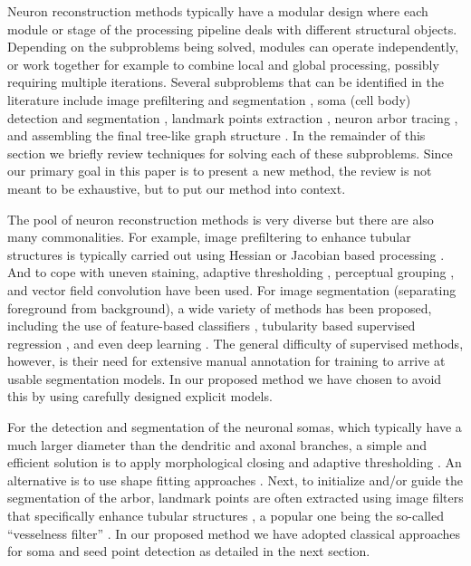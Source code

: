 Neuron reconstruction methods typically have a modular design where each module or stage of the processing pipeline deals with different structural objects. Depending on the subproblems being solved, modules can operate independently, or work together for example to combine local and global processing, possibly requiring multiple iterations. Several subproblems that can be identified in the literature include image prefiltering and segmentation \cite{zhou2015adaptive, turetken2011automated, sironi2016multiscale, mukherjee2013vector}, soma (cell body) detection and segmentation \cite{quan2013neurogps}, landmark points extraction \cite{al2008improved, wang2011broadly, choromanska2012automatic, su2012junction, radojevic2016fuzzy}, neuron arbor tracing \cite{zhao2011automated, liu2016rivulet, leandro2009automatic, radojevic2017automated, xiao2013app2}, and assembling the final tree-like graph structure \cite{zhou2016tremap, turetken2011automated, yuan2009mdl}. In the remainder of this section we briefly review techniques for solving each of these subproblems. Since our primary goal in this paper is to present a new method, the review is not meant to be exhaustive, but to put our method into context.

The pool of neuron reconstruction methods is very diverse \cite{meijering2010neuron, donohue2011automated, acciai2016automated, peng2015bigneuron} but there are also many commonalities. For example, image prefiltering to enhance tubular structures is typically carried out using Hessian or Jacobian based processing \cite{xiong2006automated, al2008improved, yuan2009mdl, wang2011broadly}. And to cope with uneven staining, adaptive thresholding \cite{zhou2015adaptive}, perceptual grouping \cite{narayanaswamy20113}, and vector field convolution \cite{mukherjee2015tubularity} have been used. For image segmentation (separating foreground from background), a wide variety of methods has been proposed, including the use of feature-based classifiers \cite{turetken2011automated, chen2015smarttracing, jimenez2015improved}, tubularity based supervised regression \cite{sironi2016multiscale}, and even deep learning \cite{li2017deep}. The general difficulty of supervised methods, however, is their need for extensive manual annotation for training to arrive at usable segmentation models. In our proposed method we have chosen to avoid this by using carefully designed explicit models.

For the detection and segmentation of the neuronal somas, which typically have a much larger diameter than the dendritic and axonal branches, a simple and efficient solution is to apply morphological closing and adaptive thresholding \cite{yan2013automated}. An alternative is to use shape fitting approaches \cite{quan2013neurogps}. Next, to initialize and/or guide the segmentation of the arbor, landmark points are often extracted using image filters that specifically enhance tubular structures \cite{wang2011broadly, turetken2011automated, choromanska2012automatic, su2012junction, radojevic2016fuzzy}, a popular one being the so-called ``vesselness filter'' \cite{frangi1998multiscale}. In our proposed method we have adopted classical approaches for soma and seed point detection as detailed in the next section.

